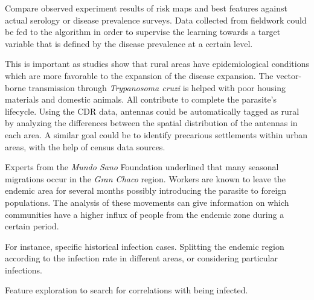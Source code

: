 \begin{description}
    \item [Results validation.] Compare observed experiment results of risk maps and best features against actual serology or disease prevalence surveys.
    Data collected from fieldwork could be fed to the algorithm in order to supervise the learning towards a target variable that is defined by the disease prevalence at a certain level.

    \item [Differentiating rural antennas from urban ones.] This is important as studies show that rural areas have epidemiological conditions which are more favorable to the expansion of the disease expansion.
    The vector-borne transmission through \textit{Trypanosoma cruzi} is helped with poor housing materials and domestic animals.
    All  contribute to complete the parasite's lifecycle.
    Using the CDR data, antennas could be automatically tagged as rural by analyzing the differences between the spatial distribution of the antennas in each area.
    A similar goal could be to identify precarious settlements within urban areas, with the help of census data sources.

    \item [Seasonal migration analysis.] Experts from the \textit{Mundo Sano} Foundation underlined that many seasonal migrations occur in the \textit{Gran Chaco} region.
    Workers are known to leave the endemic area for several months possibly introducing the parasite to foreign populations.
    The analysis of these movements can give information on which communities have a higher influx of people from the endemic zone during a certain period.

    \item [Search for epidemiological data at a finer grain.] For instance, specific historical infection cases. Splitting the endemic region according to the infection rate in different areas, or considering particular infections.
    \item Feature exploration to search for correlations with being infected.

\end{description}



